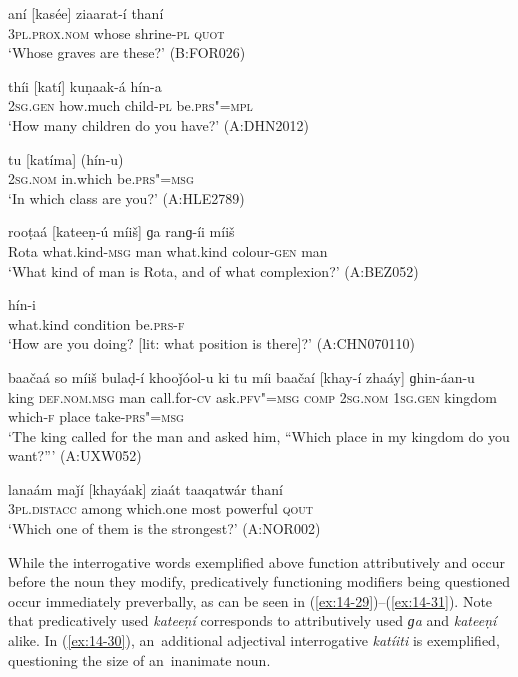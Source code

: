 \begin{exe}
\ex
\label{ex:14-23}
\gll aní [kasée] ziaarat-í thaní \\
\textsc{3pl.prox.nom} whose shrine-\textsc{pl} \textsc{quot} \\
\glt `Whose graves are these?' (B:FOR026)

\ex
\label{ex:14-24}
\gll thíi [katí] kuṇaak-á hín-a \\
\textsc{2sg.gen} how.much child-\textsc{pl} be.\textsc{prs"=mpl} \\
\glt `How many children do you have?' (A:DHN2012)

\ex
\label{ex:14-25}
\gll tu [katíma] (hín-u) \\
\textsc{2sg.nom} in.which be.\textsc{prs"=msg} \\
\glt `In which class are you?' (A:HLE2789)

\ex
\label{ex:14-26}
\gll rooṭaá [kateeṇ-ú míiš] ɡa ranɡ-íi  míiš \\
Rota what.kind-\textsc{msg} man what.kind colour-\textsc{gen} man  \\
\glt `What kind of man is Rota, and of what complexion?' (A:BEZ052)

\ex
\label{ex:14-27}
\gll [ɡa haál] hín-i \\
what.kind condition be.\textsc{prs-f} \\
\glt `How are you doing? [lit: what position is there]?' (A:CHN070110)

\ex
\label{ex:14-28}
\gll baačaá so míiš bulaḍ-í khooǰóol-u ki tu míi baačaí [khay-í zhaáy] ɡhin-áan-u \\
king \textsc{def.nom.msg} man call.for-\textsc{cv} ask.\textsc{pfv"=msg} \textsc{comp} \textsc{2sg.nom} \textsc{1sg.gen} kingdom which-\textsc{f} place take-\textsc{prs"=msg}  \\
\glt `The king called for the man and asked him, ``Which place in my kingdom do you want?''' (A:UXW052)

\ex
\label{ex:14-28b}
\gll lanaám maǰí [khayáak] ziaát taaqatwár thaní\\
\textsc{3pl.distacc} among which.one most powerful \textsc{qout}\\
\glt `Which one of them is the strongest?' (A:NOR002)
\end{exe}




While the interrogative words exemplified above function attributively and occur before the noun they modify, predicatively functioning modifiers being questioned occur immediately preverbally, as can be seen in (\ref{ex:14-29})--(\ref{ex:14-31}). Note that predicatively used \textit{kateeṇí} corresponds to attributively used \textit{ɡa} and \textit{kateeṇí} alike. In (\ref{ex:14-30}), an~additional adjectival interrogative \textit{katíiti} is exemplified, questioning the size of an~inanimate noun.

